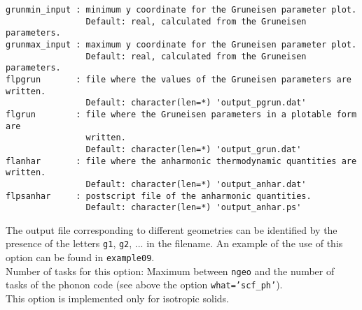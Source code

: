 \documentclass[12pt,a4paper]{article}
\begin{document}
\begin{verbatim}
grunmin_input : minimum y coordinate for the Gruneisen parameter plot.
                Default: real, calculated from the Gruneisen parameters.
grunmax_input : maximum y coordinate for the Gruneisen parameter plot.
                Default: real, calculated from the Gruneisen parameters.
flpgrun       : file where the values of the Gruneisen parameters are written. 
                Default: character(len=*) 'output_pgrun.dat'
flgrun        : file where the Gruneisen parameters in a plotable form are
                written.
                Default: character(len=*) 'output_grun.dat'
flanhar       : file where the anharmonic thermodynamic quantities are written.
                Default: character(len=*) 'output_anhar.dat'
flpsanhar     : postscript file of the anharmonic quantities.
                Default: character(len=*) 'output_anhar.ps'
\end{verbatim}
The output file corresponding to different geometries can be identified
by the presence of the letters \texttt{g1}, \texttt{g2}, ... in the filename.
An example of the use of this option can be found in \texttt{example09}. \\
Number of tasks for this option: Maximum between \texttt{ngeo} and the number
of tasks of the phonon code (see above the option \texttt{what='scf\_ph'}). \\
This option is implemented only for isotropic solids.
\end{document}
